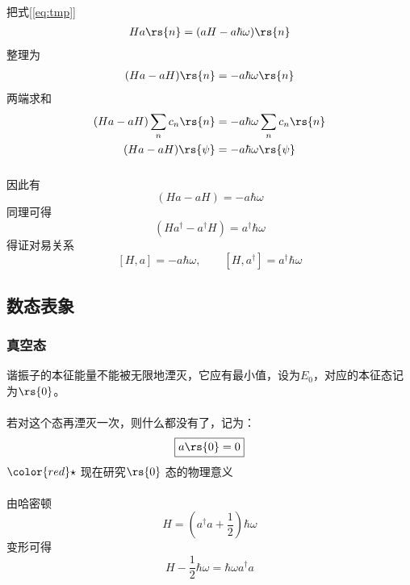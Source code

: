 \begin{frame}
      \frametitle{}
      ~~\\ 
\证 把式[\ref{eq:tmp}]
\begin{equation*}
    \begin{aligned}
       H a \rs{n}  
         &=  (aH - a \hbar \omega ) \rs{n} \\ 
   \end{aligned}   
    \end{equation*} 
整理为
\[ 
\begin{aligned}
    (H a-aH)\rs{n}  
      &= - a \hbar \omega  \rs{n} \\ 
\end{aligned}
\]
两端求和
\[ 
\begin{aligned}
    (H a-aH)\sum_n c_n \rs{n}  &= - a \hbar \omega \sum_n c_n \rs{n}   \\ 
    (H a-aH)\rs{\psi}  &= - a \hbar \omega \rs{\psi}  \\ 
\end{aligned}
\]
\end{frame}

\begin{frame}
      \frametitle{}
因此有 
\[(H a-aH)= - a \hbar \omega\]
同理可得
\[(H a^\dagger-a^\dagger H)= a^\dagger \hbar \omega\]
得证对易关系
\[[H, a ] = - a \hbar \omega, \qquad  [H, a^\dagger ] =  a^\dagger \hbar \omega\]
\end{frame}

\subsection{数态表象}
\begin{frame}
    \frametitle{真空态}
谐振子的本征能量不能被无限地湮灭，它应有最小值，设为$E_0$，对应的本征态记为$\rs{0}$。\\ 
~~\\ 
若对这个态再湮灭一次，则什么都没有了，记为：
\[ \boxed{a \rs{0}= 0 }\] 
${\color{red}\star}~$现在研究$ \rs{0}  $ 态的物理意义\\
~~\\ 
由哈密顿 \[H=(a ^\dagger a + \frac{1}{2})\hbar \omega\]  
变形可得 
\[H-\frac{1}{2}\hbar \omega=\hbar \omega a ^\dagger a \] 
\end{frame}

